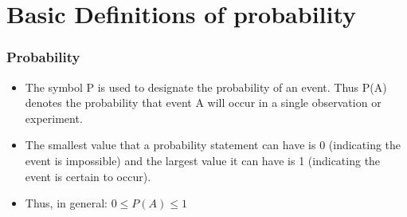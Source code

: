 \documentclass[IntroMain.tex]{subfiles}
\begin{document}
	
	\section{Basic Definitions of probability}
	\begin{frame}
		\frametitle{Probability}
		\Large
		\begin{itemize}
			\item The symbol P is used to designate the probability of an event. Thus P(A) denotes the probability that event
			A will occur in a single observation or experiment.
			
			\item The smallest value that a probability statement can have is 0 (indicating the event is impossible) and the
			largest value it can have is 1 (indicating the event is certain to occur). 
			\item Thus, in general:
			$0 	\leq P(A) \leq 1$
		\end{itemize}
	\end{frame}
	
\end{document}
